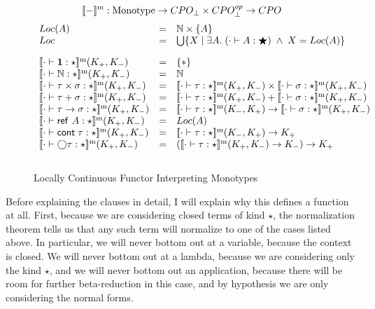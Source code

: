 \begin{figure}
\begin{displaymath}
[\![{-}]\!]^{\mathrm{m}} : \mbox{Monotype} \to CPO_\bot \times CPO^{op}_\bot \to CPO   
\end{displaymath}
\begin{displaymath}
\begin{array}{lcl}
Loc(A) & = & \N \times \setof{A} \\
Loc    & = & \bigcup \setof{X \;|\; \exists A.\; (\judgeWK[\cdot]{A}{\bigstar}) \;\land\;X = Loc(A)} \\[1em]

\interpmono{\judgeWK[\cdot]{\unittype}{\star}}(K_+, K_-) & = & \setof{*} \\

\interpmono{\judgeWK[\cdot]{\N}{\star}}(K_+, K_-) & = &  \N \\

\interpmono{\judgeWK[\cdot]{\tau \times \sigma}{\star}}(K_+, K_-) & = & 
  \interpmono{\judgeWK[\cdot]{\tau}{\star}}(K_+, K_-) \times 
  \interpmono{\judgeWK[\cdot]{\sigma}{\star}}(K_+, K_-) \\

\interpmono{\judgeWK[\cdot]{\tau + \sigma}{\star}}(K_+, K_-) & = & 
  \interpmono{\judgeWK[\cdot]{\tau}{\star}}(K_+, K_-) + 
  \interpmono{\judgeWK[\cdot]{\sigma}{\star}}(K_+, K_-) \\


\interpmono{\judgeWK[\cdot]{\tau \to \sigma}{\star}}(K_+, K_-) & = & 
  \interpmono{\judgeWK[\cdot]{\tau}{\star}}(K_-, K_+) \to
  \interpmono{\judgeWK[\cdot]{\sigma}{\star}}(K_+, K_-) \\

\interpmono{\judgeWK[\cdot]{\reftype{A}}{\star}}(K_+, K_-) & = & Loc(A) \\

\interpmono{\judgeWK[\cdot]{\cont{\tau}}{\star}}(K_+, K_-) & = & 
    \interpmono{\judgeWK[\cdot]{\tau}{\star}}(K_-,K_+) \to K_+ \\

\interpmono{\judgeWK[\cdot]{\monad{\tau}}{\star}}(K_+, K_-) & = & 
   (\interpmono{\judgeWK[\cdot]{\tau}{\star}}(K_+, K_-) \to K_-) \to K_+ \\[1em]
\end{array}
\end{displaymath}
\caption{Locally Continuous Functor Interpreting Monotypes}
\label{interp-monotypes}
\end{figure}
Before explaining the clauses in detail, I will explain why this
defines a function at all. First, because we are considering closed
terms of kind $\star$, the normalization theorem tells us that any
such term will normalize to one of the cases listed above. In
particular, we will never bottom out at a variable, because the
context is closed. We will never bottom out at a lambda, because we
are considering only the kind $\star$, and we will never bottom out an
application, because there will be room for further beta-reduction in
this case, and by hypothesis we are only considering the normal forms.

